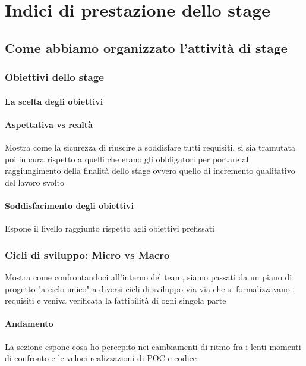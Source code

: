 
\chapter{Indici di prestazione dello stage}
\label{cap:performance-stage}
\section{Come abbiamo organizzato l'attività di stage}
\subsection{Obiettivi dello stage}
\subsubsection{La scelta degli obiettivi}
\subsubsection{Aspettativa vs realtà}
Mostra come la sicurezza di riuscire a soddisfare tutti requisiti, si sia tramutata poi in cura rispetto a quelli che erano gli obbligatori per portare al raggiungimento della finalità dello stage ovvero quello di incremento qualitativo del lavoro svolto
\subsubsection{Soddisfacimento degli obiettivi}
Espone il livello raggiunto rispetto agli obiettivi prefissati
\subsection{Cicli di sviluppo: Micro vs Macro}
Mostra come confrontandoci all'interno del team, siamo passati da un piano di progetto "a ciclo unico" a diversi cicli di sviluppo via via che si formalizzavano i requisiti e veniva verificata la fattibilità di ogni singola parte
\subsubsection{Andamento}
La sezione espone cosa ho percepito nei cambiamenti di ritmo fra i lenti momenti di confronto e le veloci realizzazioni di POC e codice
